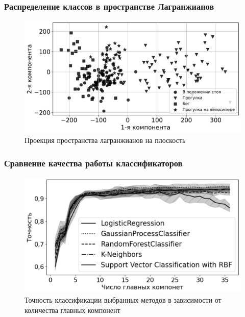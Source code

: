 \documentclass{beamer}
\begin{document}
  

\begin{frame}
\frametitle{Распределение классов в пространстве Лагранжианов}
\begin{figure}[H]
 \centering
 \includegraphics[scale = 0.45]{Data.pdf}
 \caption{Проекция пространства лагранжианов на плоскость}
 \label{fig: 2D}
\end{figure}

\end{frame}

\begin{frame}
\frametitle{Сравнение качества работы классификаторов}
\begin{figure}[H]
 \centering
 \includegraphics[scale = 0.4]{Accuracy.pdf}
 \caption{Точность классификации выбранных методов в зависимости от количества главных компонент}
\end{figure}


\end{frame}
\end{document}
